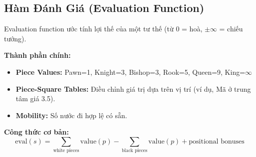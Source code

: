 \subsection{Hàm Đánh Giá (Evaluation Function)}
Evaluation function ước tính lợi thế của một tư thế (từ 0 = hoà, $\pm \infty$ = chiếu tướng).

\textbf{Thành phần chính:}
\begin{itemize}
    \item \textbf{Piece Values:} Pawn=1, Knight=3, Bishop=3, Rook=5, Queen=9, King=$\infty$
    \item \textbf{Piece-Square Tables:} Điều chỉnh giá trị dựa trên vị trí (ví dụ, Mã ở trung tâm giá 3.5).
    \item \textbf{Mobility:} Số nước đi hợp lệ có sẵn.
\end{itemize}

\textbf{Công thức cơ bản:}
$$\text{eval}(s) = \sum_{\text{white pieces}} \text{value}(p) - \sum_{\text{black pieces}} \text{value}(p) + \text{positional bonuses}$$

